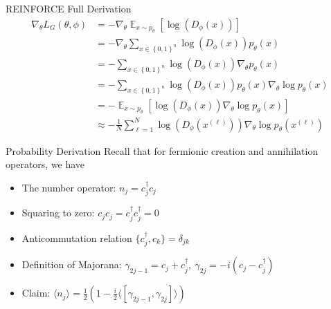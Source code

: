 \documentclass[xcolor=dvipsnames]{beamer}
\DeclareMathOperator*{\E}{\mathbb{E}}
\newcommand{\set}[1]{\left\{#1\right\}}
\begin{document}
\begin{frame}{REINFORCE Full Derivation}
  \begin{align*}
    \nabla_\theta L_G(\theta,\phi)&=-\nabla_\theta\E_{x\sim p_\theta}\left[\log(D_\phi(x))\right]\\
    &=-\nabla_\theta\sum_{x\in\set{0,1}^n}\log(D_\phi(x))p_\theta(x)\\
    &=-\sum_{x\in\set{0,1}^n}\log(D_\phi(x))\nabla_\theta p_\theta(x)\\
    &=-\sum_{x\in\set{0,1}^n}\log(D_\phi(x))p_\theta(x)\nabla_\theta\log p_\theta(x)\\
    &=-\E_{x\sim p_\theta}\left[\log(D_\phi(x))\nabla_\theta\log p_\theta(x)\right]\\
    &\approx -\frac{1}{N}\sum_{\ell=1}^N\log(D_\phi(x^{(\ell)}))\nabla_\theta\log p_\theta(x^{(\ell)})
  \end{align*}
\end{frame}

\begin{frame}{Probability Derivation}
  Recall that for fermionic creation and annihilation operators, we have 
  \begin{itemize}
    \item The number operator: $n_j=c_j^\dagger c_j$
    \item Squaring to zero: $c_jc_j=c_j^\dagger c_j^\dagger=0$
    \item Anticommutation relation $\{c_j^\dagger,c_k\}=\delta_{jk}$
    \item Definition of Majorana: $\gamma_{2j-1}=c_j+c_j^\dagger,~\gamma_{2j}=-i(c_j-c_j^\dagger)$
    \item Claim: $\langle n_j\rangle=\frac12(1-\frac{i}{2}\langle [\gamma_{2j-1},\gamma_{2j}]\rangle)$
  \end{itemize}
\end{frame}
\end{document}
